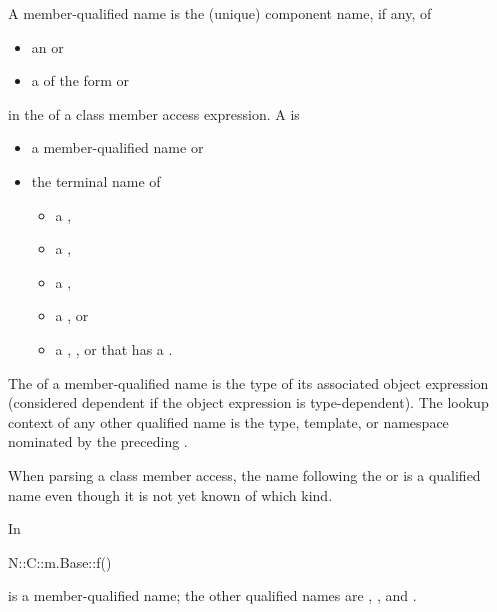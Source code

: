 \pnum
A member-qualified name is
the (unique) component name, if any, of
\begin{itemize}
\item
an  or
\item
a  of the form
 \tcode{::} or  \tcode{::}
\end{itemize}
in the  of a class member access expression.
A  is
\begin{itemize}
\item a member-qualified name or
\item the terminal name of
\begin{itemize}
\item a ,
\item a ,
\item a ,
\item a , or
\item a ,
, or
that has a .
\end{itemize}
\end{itemize}
The  of a member-qualified name is
the type of its associated object expression
(considered dependent if the object expression is type-dependent).
The lookup context of any other qualified name is
the type, template, or namespace
nominated by the preceding .
\begin{note}
When parsing a class member access,
the name following the \tcode{->} or  is
a qualified name even though it is not yet known of which kind.
\end{note}
\begin{example}
In
\begin{codeblock}
  N::C::m.Base::f()
\end{codeblock}
 is a member-qualified name;
the other qualified names are , , and .
\end{example}

